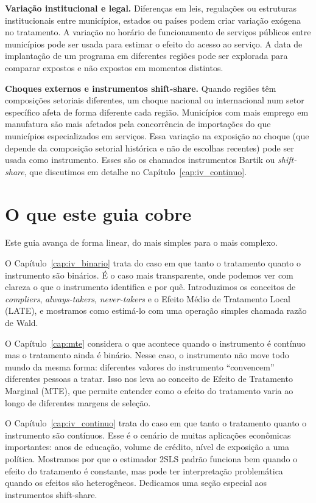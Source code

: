 \textbf{Variação institucional e legal.} Diferenças em leis, regulações ou estruturas institucionais entre municípios, estados ou países podem criar variação exógena no tratamento. A variação no horário de funcionamento de serviços públicos entre municípios pode ser usada para estimar o efeito do acesso ao serviço. A data de implantação de um programa em diferentes regiões pode ser explorada para comparar expostos e não expostos em momentos distintos.

\textbf{Choques externos e instrumentos shift-share.} Quando regiões têm composições setoriais diferentes, um choque nacional ou internacional num setor específico afeta de forma diferente cada região. Municípios com mais emprego em manufatura são mais afetados pela concorrência de importações do que municípios especializados em serviços. Essa variação na exposição ao choque (que depende da composição setorial histórica e não de escolhas recentes) pode ser usada como instrumento. Esses são os chamados instrumentos Bartik ou \textit{shift-share}, que discutimos em detalhe no Capítulo~\ref{cap:iv_continuo}.

\section{O que este guia cobre}
\label{sec:estrutura}

Este guia avança de forma linear, do mais simples para o mais complexo.

O Capítulo~\ref{cap:iv_binario} trata do caso em que tanto o tratamento quanto o instrumento são binários. É o caso mais transparente, onde podemos ver com clareza o que o instrumento identifica e por quê. Introduzimos os conceitos de \textit{compliers}, \textit{always-takers}, \textit{never-takers} e o Efeito Médio de Tratamento Local (LATE), e mostramos como estimá-lo com uma operação simples chamada razão de Wald.

O Capítulo~\ref{cap:mte} considera o que acontece quando o instrumento é contínuo mas o tratamento ainda é binário. Nesse caso, o instrumento não move todo mundo da mesma forma: diferentes valores do instrumento ``convencem'' diferentes pessoas a tratar. Isso nos leva ao conceito de Efeito de Tratamento Marginal (MTE), que permite entender como o efeito do tratamento varia ao longo de diferentes margens de seleção.

O Capítulo~\ref{cap:iv_continuo} trata do caso em que tanto o tratamento quanto o instrumento são contínuos. Esse é o cenário de muitas aplicações econômicas importantes: anos de educação, volume de crédito, nível de exposição a uma política. Mostramos por que o estimador 2SLS padrão funciona bem quando o efeito do tratamento é constante, mas pode ter interpretação problemática quando os efeitos são heterogêneos. Dedicamos uma seção especial aos instrumentos shift-share.

